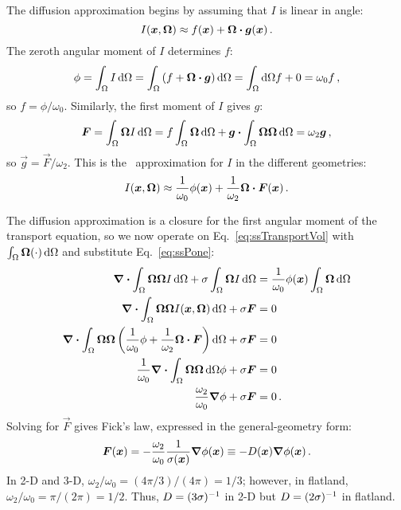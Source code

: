 The diffusion approximation begins by assuming that $I$ is linear in angle:
\begin{equation*}
  I(\bm{x}, \bm{\Omega}) \approx f(\bm{x}) + \bm{\Omega} \bm{\cdot}
  \bm{g}(\bm{x})\,.
\end{equation*}
The zeroth angular moment of $I$ determines $f$:
\begin{equation*}
  \phi = \int_\Omega I \mathop{}\!\mathrm{d} \Omega
= \int_\Omega \left( f + \bm{\Omega}\bm{\cdot} \bm{g} \right) \mathop{}\!\mathrm{d}\Omega
= \int_\Omega\mathop{}\!\mathrm{d}\Omega f + 0
= \omega_0 f \,,
\end{equation*}
so $f = \phi/\omega_0$. Similarly, the first moment of $I$ gives $g$:
\begin{equation*}
  \bm{F} = \int_\Omega \bm{\Omega} I \mathop{}\!\mathrm{d} \Omega
= f \int_\Omega \bm{\Omega} \mathop{}\!\mathrm{d}\Omega
  + \bm{g} \bm{\cdot} \int_\Omega \bm{\Omega}\bm{\Omega} \mathop{}\!\mathrm{d}\Omega
= \omega_2 \bm{g} \,,
\end{equation*}
so $\vec{g} = \vec{F}/\omega_2$. This is the \Pone\ approximation for $I$ in the different geometries:
\begin{equation}\label{eq:ssPone}
  I(\bm{x}, \bm{\Omega})
  \approx \frac{1}{\omega_0} \phi(\bm{x})
  + \frac{1}{\omega_2} \bm{\Omega} \bm{\cdot} \bm{F}(\bm{x})\,.
\end{equation}

The diffusion approximation is a closure for the first angular moment of
the transport equation, so we now operate on Eq.~\eqref{eq:ssTransportVol} with
$\int_\Omega \bm{\Omega} (\cdot) \mathop{}\!\mathrm{d} \Omega$ and substitute
Eq.~\eqref{eq:ssPone}:
\begin{align*}
  \bm{\nabla} \bm{\cdot} \int_\Omega \bm{\Omega} \bm{\Omega} I
  \mathop{}\!\mathrm{d}\Omega
  + \sigma \int_\Omega \bm{\Omega} I \mathop{}\!\mathrm{d}\Omega
  &= \frac{1}{\omega_0} \phi(\bm{x}) \int_\Omega \bm{\Omega} \mathop{}\!\mathrm{d}\Omega
  \\
  \bm{\nabla} \bm{\cdot} \int_\Omega \bm{\Omega} \bm{\Omega} I(\bm{x}, \bm{\Omega})
  \mathop{}\!\mathrm{d}\Omega
  + \sigma \bm{F}
  &= 0
  \\
  \bm{\nabla} \bm{\cdot} \int_\Omega \bm{\Omega} \bm{\Omega} \left(
  \frac{1}{\omega_0}\phi + \frac{1}{\omega_2} \bm{\Omega} \bm{\cdot} \bm{F}
  \right) \mathop{}\!\mathrm{d}\Omega
  + \sigma \bm{F}
  &= 0
  \\
  \frac{1}{\omega_0} \bm{\nabla} \bm{\cdot} \int_\Omega \bm{\Omega} \bm{\Omega}
  \mathop{}\!\mathrm{d}\Omega \phi 
  + \sigma \bm{F} &= 0
  \\
  \frac{\omega_2}{\omega_0} \bm{\nabla} \phi + \sigma \bm{F} &= 0 \,.
\end{align*}
Solving for $\vec{F}$ gives Fick's law, expressed in the general-geometry form:
\begin{equation} \label{eq:fickGeneral}
  \bm{F}(\bm{x})
  = - \frac{\omega_2}{\omega_0} \frac{1}{\sigma(\bm{x})} \bm{\nabla} \phi(\bm{x})
  \equiv -D(\bm{x}) \bm{\nabla} \phi(\bm{x})\,.
\end{equation}
In 2-D and 3-D, $\omega_2/\omega_0 = (4\pi / 3) / (4\pi) = 1/3$; however, in
flatland, $\omega_2/\omega_0 = \pi / (2\pi) = 1/2$. Thus, $D=(3\sigma)^{-1}$ in
2-D but $D=(2\sigma)^{-1}$ in flatland.

